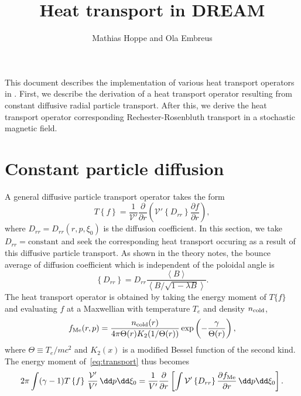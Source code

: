 \documentclass{notes}
\title{Heat transport in DREAM}
\author{Mathias Hoppe and Ola Embreus}
\newcommand{\fMe}{f_{\rm Me}}
\newcommand{\ncold}{n_{\rm cold}}
\newcommand{\Te}{T_e}
\newcommand{\Vp}{\mathcal{V}'}
\newcommand{\VpVol}{V'}
\begin{document}
    \maketitle

    \noindent
    This document describes the implementation of various heat transport
    operators in \DREAM. First, we describe the derivation of a heat transport
    operator resulting from constant diffusive radial particle transport.
    After this, we derive the heat transport operator corresponding
    Rechester-Rosenbluth transport in a stochastic magnetic field.

    \tableofcontents

    \section{Constant particle diffusion}\label{sec:constant}
    A general diffusive particle transport operator takes the form
    \begin{equation}\label{eq:transport}
        T\left\{ f \right\} = \frac{1}{\Vp}\frac{\partial}{\partial r}\left(
            \Vp \left\{D_{rr}\right\}\frac{\partial f}{\partial r}
        \right),
    \end{equation}
    where $D_{rr} = D_{rr}(r,p,\xi_0)$ is the diffusion coefficient. In this
    section, we take $D_{rr} = \text{constant}$ and seek the corresponding heat
    transport occuring as a result of this diffusive particle transport. As
    shown in the theory notes, the bounce average of diffusion coefficient which
    is independent of the poloidal angle is
    \begin{equation}
        \left\{ D_{rr} \right\} = D_{rr}\frac{\left\langle B\right\rangle}{\left\langle B/\sqrt{1-\lambda B} \right\rangle}.
    \end{equation}
    The heat transport operator is obtained by taking the energy moment of
    $T\{f\}$ and evaluating $f$ at a Maxwellian with temperature $\Te$ and
    density $\ncold$,
    \begin{equation}
        \fMe(r,p) = \frac{\ncold(r)}{4\pi\Theta(r) K_2(1/\Theta(r))}\exp\left(-\frac{\gamma}{\Theta(r)}\right),
    \end{equation}
    where $\Theta\equiv\Te/mc^2$ and $K_2(x)$ is a modified Bessel function of
    the second kind. The energy moment of~\eqref{eq:transport} thus becomes
    \begin{equation}
        2\pi\int(\gamma-1) T\left\{f\right\}\,\frac{\Vp}{\VpVol}\,\dd p\dd\xi_0 =
        \frac{1}{\VpVol}\frac{\partial}{\partial r}\left[
            \int \Vp\left\{D_{rr}\right\}\frac{\partial\fMe}{\partial r}\,\dd p\dd\xi_0
        \right].
    \end{equation}
\end{document}
